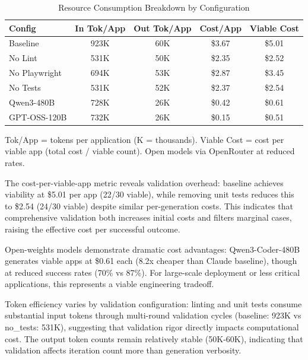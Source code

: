 \documentclass[conference]{IEEEtran}
\begin{document}
\begin{table}[!t]
\caption{Resource Consumption Breakdown by Configuration}
\label{tab:cost-token-breakdown}
\centering
\small
\begin{threeparttable}
\begin{tabular}{@{}lcccc@{}}
\toprule
\textbf{Config} & \textbf{In Tok/App} & \textbf{Out Tok/App} & \textbf{Cost/App} & \textbf{Viable Cost} \\
\midrule
Baseline & 923K & 60K & \$3.67 & \$5.01 \\
No Lint & 531K & 50K & \$2.35 & \$2.52 \\
No Playwright & 694K & 53K & \$2.87 & \$3.45 \\
No Tests & 531K & 52K & \$2.37 & \$2.54 \\
\midrule
Qwen3-480B & 728K & 26K & \$0.42 & \$0.61 \\
GPT-OSS-120B & 732K & 26K & \$0.15 & \$0.51 \\
\bottomrule
\end{tabular}
\begin{tablenotes}\footnotesize
\item Tok/App = tokens per application (K = thousands). Viable Cost = cost per viable app (total cost / viable count). Open models via OpenRouter at reduced rates.
\end{tablenotes}
\end{threeparttable}
\end{table}

The cost-per-viable-app metric reveals validation overhead: baseline achieves viability at \$5.01 per app (22/30 viable), while removing unit tests reduces this to \$2.54 (24/30 viable) despite similar per-generation costs. This indicates that comprehensive validation both increases initial costs and filters marginal cases, raising the effective cost per successful outcome.

Open-weights models demonstrate dramatic cost advantages: Qwen3-Coder-480B generates viable apps at \$0.61 each (8.2x cheaper than Claude baseline), though at reduced success rates (70\% vs 87\%). For large-scale deployment or less critical applications, this represents a viable engineering tradeoff.

Token efficiency varies by validation configuration: linting and unit tests consume substantial input tokens through multi-round validation cycles (baseline: 923K vs no\_tests: 531K), suggesting that validation rigor directly impacts computational cost. The output token counts remain relatively stable (50K-60K), indicating that validation affects iteration count more than generation verbosity.
\end{document}
